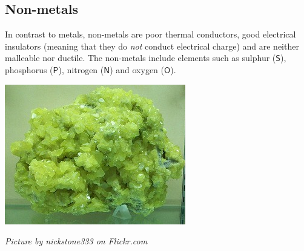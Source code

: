             \subsection*{Non-metals}
            \nopagebreak
\begin{minipage}{.5\textwidth}
        \label{m38708*id66021}In contrast to metals, non-metals are poor thermal conductors, good electrical insulators (meaning that they do \textsl{not} conduct electrical charge) and are neither malleable nor ductile. The non-metals include elements such as sulphur ($\mathsf{S}$), phosphorus ($\mathsf{P}$), nitrogen ($\mathsf{N}$) and oxygen ($\mathsf{O}$).\par 
\end{minipage}
\begin{minipage}{.5\textwidth}
\begin{center}
 \includegraphics[width=.4\textwidth]{photos/sulphurby-nickstone333.jpg}\par
\textit{Picture by nickstone333 on Flickr.com}
\end{center}
\end{minipage}
      \label{m38708*uid94}
